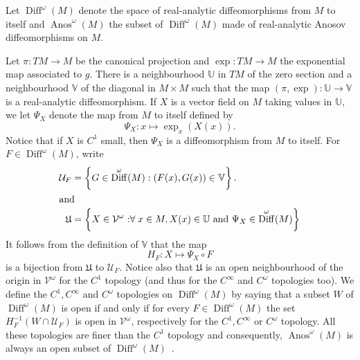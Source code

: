\documentclass[AHL,Unicode,longabstracts,published]{cedram}
\DeclareMathOperator{\Diff}{Diff}
\DeclareMathOperator{\Anos}{Anos}
\newcommand{\set}[1]{\left\{ #1 \right\}}
\newcommand{\p}[1]{\left(#1\right)}
\newcommand{\clV}{\mathcal{V}}
\newcommand{\clU}{\mathcal{U}}
\newcommand{\fkU}{\mathfrak{U}}
\newcommand{\bbU}{\mathbb{U}}
\newcommand{\bbV}{\mathbb{V}}
\let\oldforall\forall
\renewcommand*{\forall}{\mathrel{\oldforall}}
\begin{document}
Let $\Diff^\omega(M)$ denote the space of real-analytic diffeomorphisms from $M$ to itself and $\Anos^\omega(M)$ the subset of $\Diff^\omega(M)$ made of real-analytic Anosov diffeomorphisms on $M$.

Let $\pi : TM \to M$ be the canonical projection and $\exp : TM \to M$ the exponential map associated to $g$. There is a neighbourhood $\bbU$ in $TM$ of the zero section and a neighbourhood $\bbV$ of the diagonal in $M \times M$ such that the map $(\pi,\exp) : \bbU \to \bbV$ is a real-analytic diffeomorphism. If $X$ is a vector field on $M$ taking values in $\bbU$, we let $\Psi_X$ denote the map from $M$ to itself defined by
\begin{equation}\label{eq:near_identity}
\Psi_X : x \mapsto \exp_x(X(x)).
\end{equation}
Notice that if $X$ is $C^1$ small, then $\Psi_X$ is a diffeomorphism from $M$ to itself. For $F \in \Diff^\omega(M)$, write
\begin{align*}
\clU_F &= \set{ G \in \Diff^\omega(M): (F(x),G(x)) \in \bbV}.
\\
\intertext{and}
\fkU &= \set{ X \in \clV^\omega : \forall x \in M, X(x) \in \bbU \text{ and } \Psi_X \in \Diff^\omega(M)}
\end{align*}
It follows from the definition of $\bbV$ that the map
\begin{equation*}
H_F : X \mapsto \Psi_X \circ F
\end{equation*}
is a bijection from $\fkU$ to $\clU_F$. Notice also that $\fkU$ is an open neighbourhood of the origin in $\clV^\omega$ for the $C^1$ topology (and thus for the $C^\infty$ and $C^\omega$ topologies too). We define the $C^1, C^\infty$ and $C^\omega$ topologies on $\Diff^\omega(M)$ by saying that a subset $W$ of $\Diff^\omega(M)$ is open if and only if for every $F \in \Diff^\omega(M)$ the set $H_F^{-1}\p{W \cap
\clU_F}$ is open in $\clV^\omega$, respectively for the $C^1,C^\infty$ or $C^\omega$ topology. All these topologies are finer than the $C^1$ topology and consequently, $\Anos^\omega(M)$ is always an open subset of $\Diff^\omega(M)$~\cite{original_anosov}.
\end{document}
